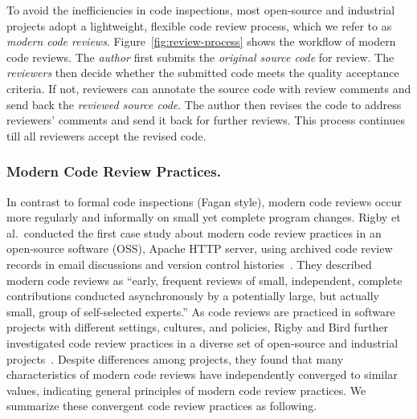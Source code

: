 \documentclass[runningheads,a4paper]{llncs}
\begin{document}
To avoid the inefficiencies in code inspections, most open-source and industrial projects adopt a lightweight, flexible code review process, which we refer to as {\em modern code reviews}. Figure~\ref{fig:review-process} shows the workflow of modern code reviews. The {\em author} first submits the {\em original source code} for review. The {\em reviewers} then decide whether the submitted code meets the quality acceptance criteria. If not, reviewers can annotate the source code with review comments and send back the {\em reviewed source code}. The author then revises the code to address reviewers' comments and send it back for further reviews. This process continues till all reviewers accept the revised code.

\subsubsection{Modern Code Review Practices.} 
In contrast to formal code inspections (Fagan style), modern code reviews occur more regularly and informally on small yet complete program changes. 
Rigby et al.~conducted the first case study about modern code review practices in an open-source software (OSS), Apache HTTP server, using archived code review records in email discussions and version control histories~\cite{Rigby2008:apache}. They described modern code reviews as ``early, frequent reviews of small, independent, complete contributions conducted asynchronously by a potentially large, but actually small, group of self-selected experts.'' As code reviews are practiced in software projects with different settings, cultures, and policies, Rigby and Bird further investigated code review practices in a diverse set of open-source and industrial projects~\cite{rigby2013convergent}. Despite differences among projects, they found that many characteristics of modern code reviews have independently converged to similar values, indicating general principles of modern code review practices. We summarize these convergent code review practices as following.
\end{document}
